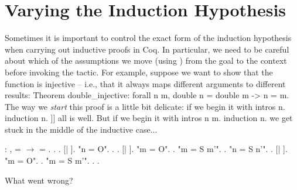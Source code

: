 \documentclass[12pt]{report}
\begin{document}
\section{Varying the Induction Hypothesis}



 Sometimes it is important to control the exact form of the
    induction hypothesis when carrying out inductive proofs in Coq.
    In particular, we need to be careful about which of the
    assumptions we move (using ) from the goal to the context
    before invoking the  tactic.  For example, suppose 
    we want to show that the  function is injective -- i.e., 
    that it always maps different arguments to different results:  
    Theorem double\_injective: forall n m, double n = double m -> n = m. 
    The way we \textit{start} this proof is a little bit delicate: if we 
    begin it with
      intros n. induction n.
]] 
    all is well.  But if we begin it with
      intros n m. induction n.
    we get stuck in the middle of the inductive case... \begin{coqdoccode}
\coqdocemptyline
\coqdocnoindent
{}  : \coqdockw{\ensuremath{\forall}}  ,\coqdoceol
\coqdocindent{2.50em}
  =   \ensuremath{\rightarrow}\coqdoceol
\coqdocindent{2.50em}
 = .\coqdoceol
\coqdocnoindent
{}.\coqdoceol
\coqdocindent{1.00em}
  .    [| ].\coqdoceol
\coqdocindent{1.00em}
 "n = O". .  .    [| ].\coqdoceol
\coqdocindent{2.00em}
 "m = O". .\coqdoceol
\coqdocindent{2.00em}
 "m = S m'".  .\coqdoceol
\coqdocindent{1.00em}
 "n = S n'".  .    [| ].\coqdoceol
\coqdocindent{2.00em}
 "m = O".  .\coqdoceol
\coqdocindent{2.00em}
 "m = S m'".  .\coqdoceol
\coqdocindent{3.00em}
.\coqdoceol
\coqdocemptyline
\end{coqdoccode}
What went wrong? 
\end{document}
